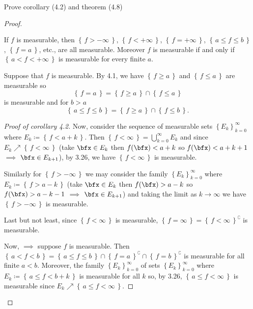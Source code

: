 \begin{problem}
Prove corollary (4.2) and theorem (4.8)
\end{problem}
\begin{proof}
\begin{corollary*}
If $f$ is measurable, then $\left\{\,f>-\infty\,\right\}$,
$\left\{\,f<+\infty\,\right\}$, $\left\{\,f=+\infty\,\right\}$,
$\left\{\,a\leq f\leq b\,\right\}$, $\left\{\,f=a\,\right\}$, etc., are all
measurable. Moreover $f$ is measurable if and only if
$\left\{\,a<f<+\infty\,\right\}$ is measurable for every finite $a$.
\end{corollary*}
Suppose that $f$ is measurable. By 4.1, we have $\left\{\,f\geq
  a\,\right\}$ and $\left\{\,f\leq a\,\right\}$ are measurable so
\begin{equation}
\label{eq:equals}
\left\{\,f=a\,\right\}=
\left\{\,f\geq a\,\right\}\cap\left\{\,f\leq a\,\right\}
\end{equation}
is measurable and for $b>a$
\begin{equation}
\label{eq:between}
\left\{\,a\leq f\leq b\,\right\}
=\left\{\,f\geq a\,\right\}\cap\left\{\,f\leq b\,\right\}.
\end{equation}
\begin{proof}[Proof of corollary 4.2]
\renewcommand\qedsymbol{$\clubsuit$}
Now, consider the sequence of measurable sets
$\left\{E_k\right\}_{k=0}^\infty$ where
$E_k\coloneqq\left\{\,f<a+k\,\right\}$. Then
$\left\{\,f<\infty\,\right\}=\bigcup_{k=0}^\infty E_k$ and since
$E_k\nearrow\left\{\,f<\infty\,\right\}$ (take $\bfx\in E_k$ then
$f(\bfx)<a+k$ so $f(\bfx)<a+k+1$ $\implies$ $\bfx\in E_{k+1}$), by 3.26, we
have $\left\{\,f<\infty\,\right\}$ is measurable.

Similarly for $\left\{\,f>-\infty\,\right\}$ we may consider the family
$\left\{E_k\right\}_{k=0}^\infty$ where
$E_k\coloneqq\left\{\,f>a-k\,\right\}$ (take $\bfx\in E_k$ then
$f(\bfx)>a-k$ so $f(\bfx)>a-k-1$ $\implies$ $\bfx\in E_{k+1}$) and taking
the limit as $k\to\infty$ we have $\left\{\,f>-\infty\,\right\}$ is
measurable.

Last but not least, since $\left\{\,f<\infty\,\right\}$ is measurable,
$\left\{\,f=\infty\,\right\}=\left\{\,f<\infty\,\right\}^\complement$ is
measurable.

Now, $\implies$ suppose $f$ is measurable. Then $\left\{\,a<
  f<b\,\right\}=\left\{\,a\leq f\leq
  b\,\right\}\cap\left\{\,f=a\,\right\}^\complement\cap\left\{\,f=b\,\right\}^\complement$
is measurable for all finite
$a<b$. Moreover, the family $\left\{E_k\right\}_{k=0}^\infty$ of sets
$\left\{E_k\right\}_{k=0}^\infty$ where $E_k\coloneqq\left\{\,a\leq
f<b+k\,\right\}$ is measurable for all $k$ so, by 3.26, $\left\{\,a\leq
f<\infty\,\right\}$ is measurable since $E_k\nearrow\left\{\,a\leq
f<\infty\,\right\}$.


\end{proof}
\end{proof}
